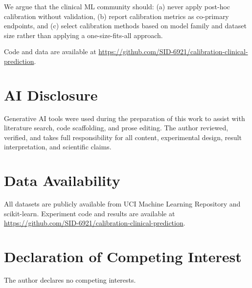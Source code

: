 \documentclass[preprint,12pt]{elsarticle}
\begin{document}
We argue that the clinical ML community should: (a) never apply post-hoc calibration without validation, (b) report calibration metrics as co-primary endpoints, and (c) select calibration methods based on model family and dataset size rather than applying a one-size-fits-all approach.

Code and data are available at \url{https://github.com/SID-6921/calibration-clinical-prediction}.

\section*{AI Disclosure}

Generative AI tools were used during the preparation of this work to assist with literature search, code scaffolding, and prose editing. The author reviewed, verified, and takes full responsibility for all content, experimental design, result interpretation, and scientific claims.

\section*{Data Availability}

All datasets are publicly available from UCI Machine Learning Repository and scikit-learn. Experiment code and results are available at \url{https://github.com/SID-6921/calibration-clinical-prediction}.

\section*{Declaration of Competing Interest}

The author declares no competing interests.



\end{document}

